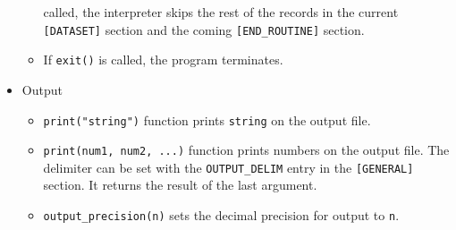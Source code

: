 \documentclass[12pt]{article}
\begin{document}
\begin{itemize}
\begin{itemize}
       called, the interpreter skips the rest of the records in the current
       \verb|[DATASET]| section and the coming \verb|[END_ROUTINE]| section.
 \item If \verb|exit()| is called, the program terminates.
\end{itemize}
\item Output
\begin{itemize}
 \item \verb|print("string")| function prints \verb|string| on the output file.
 \item \verb|print(num1, num2, ...)| function prints numbers on the
       output file.  The delimiter can be set with the
       \verb|OUTPUT_DELIM| entry in the \verb|[GENERAL]| section. It
       returns the result of the last argument.
 \item \verb|output_precision(n)| sets the decimal precision for output to \verb|n|.
\end{itemize}
\end{itemize}
\end{document}
